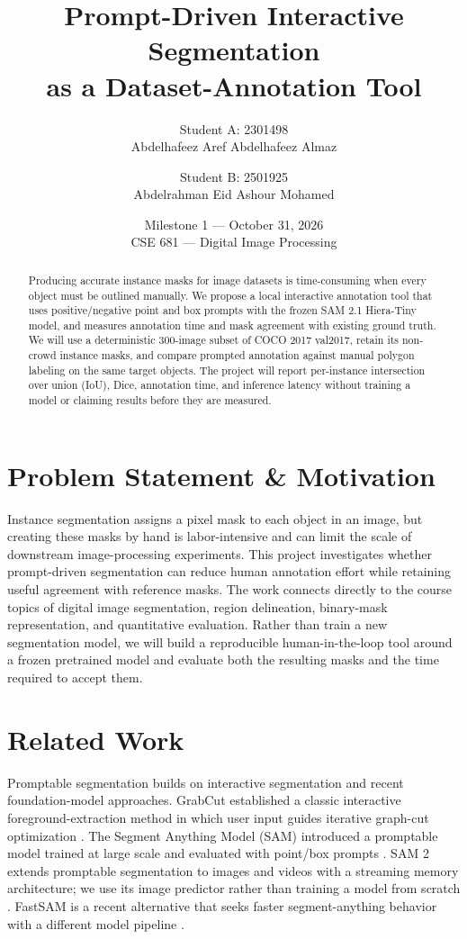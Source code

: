 \documentclass[11pt]{article}
\title{\LARGE Prompt-Driven Interactive Segmentation\\[4pt]
\large as a Dataset-Annotation Tool}
\author{
  \begin{tabular}{c}
    Student A: 2301498\\
    Abdelhafeez Aref Abdelhafeez Almaz
  \end{tabular}
  \and
  \begin{tabular}{c}
    Student B: 2501925\\
    Abdelrahman Eid Ashour Mohamed
  \end{tabular}
}
\date{Milestone 1 --- October 31, 2026\\CSE 681 --- Digital Image Processing}
\begin{document}
\maketitle

\begin{abstract}
Producing accurate instance masks for image datasets is time-consuming when
every object must be outlined manually. We propose a local interactive
annotation tool that uses positive/negative point and box prompts with the
frozen SAM 2.1 Hiera-Tiny model, and measures annotation time and mask agreement
with existing ground truth. We will use a deterministic 300-image subset of
COCO 2017 val2017, retain its non-crowd instance masks, and compare prompted
annotation against manual polygon labeling on the same target objects. The
project will report per-instance intersection over union (IoU), Dice, annotation
time, and inference latency without training a model or claiming results before
they are measured.
\end{abstract}

\section{Problem Statement \& Motivation}
\label{sec:motivation}
Instance segmentation assigns a pixel mask to each object in an image, but
creating these masks by hand is labor-intensive and can limit the scale of
downstream image-processing experiments. This project investigates whether
prompt-driven segmentation can reduce human annotation effort while retaining
useful agreement with reference masks. The work connects directly to the course
topics of digital image segmentation, region delineation, binary-mask
representation, and quantitative evaluation. Rather than train a new
segmentation model, we will build a reproducible human-in-the-loop tool around a
frozen pretrained model and evaluate both the resulting masks and the time
required to accept them.

\section{Related Work}
\label{sec:related}
Promptable segmentation builds on interactive segmentation and recent
foundation-model approaches. GrabCut established a classic interactive
foreground-extraction method in which user input guides iterative graph-cut
optimization \citep{rother2004grabcut}. The Segment Anything Model (SAM)
introduced a promptable model trained at large scale and evaluated with
point/box prompts \citep{kirillov2023sam}. SAM 2 extends promptable segmentation
to images and videos with a streaming memory architecture; we use its image
predictor rather than training a model from scratch \citep{ravi2024sam2}.
FastSAM is a recent alternative that seeks faster segment-anything behavior
with a different model pipeline \citep{zhao2023fastsam}.
\end{document}
